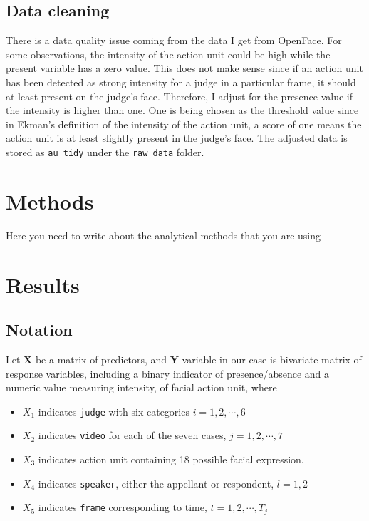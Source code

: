 \documentclass{monashthesis}
\begin{document}
\hypertarget{data-cleaning}{%
\section{Data cleaning}\label{data-cleaning}}

There is a data quality issue coming from the data I get from OpenFace. For some observations, the intensity of the action unit could be high while the present variable has a zero value. This does not make sense since if an action unit has been detected as strong intensity for a judge in a particular frame, it should at least present on the judge's face. Therefore, I adjust for the presence value if the intensity is higher than one. One is being chosen as the threshold value since in Ekman's definition of the intensity of the action unit, a score of one means the action unit is at least slightly present in the judge's face. The adjusted data is stored as \texttt{au\_tidy} under the \texttt{raw\_data} folder.

\hypertarget{methods}{%
\chapter{Methods}\label{methods}}

Here you need to write about the analytical methods that you are using

\hypertarget{results}{%
\chapter{Results}\label{results}}

\hypertarget{notation}{%
\section{Notation}\label{notation}}

Let \(\mathbf{X}\) be a matrix of predictors, and \(\mathbf{Y}\) variable in our case is bivariate matrix of response variables, including a binary indicator of presence/absence and a numeric value measuring intensity, of facial action unit, where

\begin{itemize}
\tightlist
\item
  \(X_1\) indicates \texttt{judge} with six categories \(i = 1,2, \cdots, 6\)
\item
  \(X_2\) indicates \texttt{video} for each of the seven cases, \(j = 1,2, \cdots, 7\)
\item
  \(X_3\) indicates action unit containing 18 possible facial expression.\\
\item
  \(X_4\) indicates \texttt{speaker}, either the appellant or respondent, \(l=1,2\)
\item
  \(X_5\) indicates \texttt{frame} corresponding to time, \(t = 1,2, \cdots, T_j\)
\end{itemize}
\end{document}
